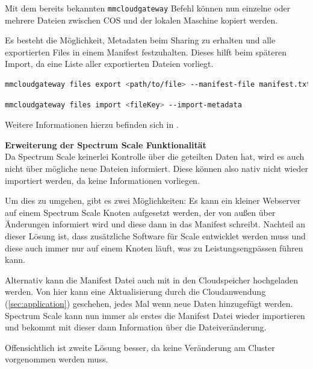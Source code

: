 Mit dem bereits bekannten \lstinline|mmcloudgateway| Befehl können nun einzelne oder mehrere Dateien zwischen \ac{COS} und der lokalen Maschine kopiert werden.

Es besteht die Möglichkeit, Metadaten beim Sharing zu erhalten und alle exportierten Files in einem Manifest festzuhalten. Dieses hilft beim späteren Import, da eine Liste aller exportierten Dateien vorliegt. 

\begin{lstlisting}[language=bash, caption=Export von lokalen Dateien]
mmcloudgateway files export <path/to/file> --manifest-file manifest.txt --export-metadata
\end{lstlisting}

\begin{lstlisting}[language=bash, caption=Import von COS Dateien]
mmcloudgateway files import <fileKey> --import-metadata
\end{lstlisting}

Weitere Informationen hierzu befinden sich in \cite[S. 613]{scale.2017}.

\textbf{Erweiterung der Spectrum Scale Funktionalität}\\
Da Spectrum Scale keinerlei Kontrolle über die geteilten Daten hat, wird es auch nicht über mögliche neue Dateien informiert. Diese können also nativ nicht wieder importiert werden, da keine Informationen vorliegen.

Um dies zu umgehen, gibt es zwei Möglichkeiten: Es kann ein kleiner Webserver auf einem Spectrum Scale Knoten aufgesetzt werden, der von außen über Änderungen informiert wird und diese dann in das Manifest schreibt. Nachteil an dieser Lösung ist, dass zusätzliche Software für Scale entwicklet werden muss und diese auch immer nur auf einem Knoten läuft, was zu Leistungsengpässen führen kann.

Alternativ kann die Manifest Datei auch mit in den Cloudspeicher hochgeladen werden. Von hier kann eine Aktualisierung durch die Cloudanwendung (\autoref{sec:application}) geschehen, jedes Mal wenn neue Daten hinzugefügt werden. Spectrum Scale kann nun immer als erstes die Manifest Datei wieder importieren und bekommt mit dieser dann Information über die Dateiveränderung.

Offensichtlich ist zweite Lösung besser, da keine Veränderung am Cluster vorgenommen werden muss.